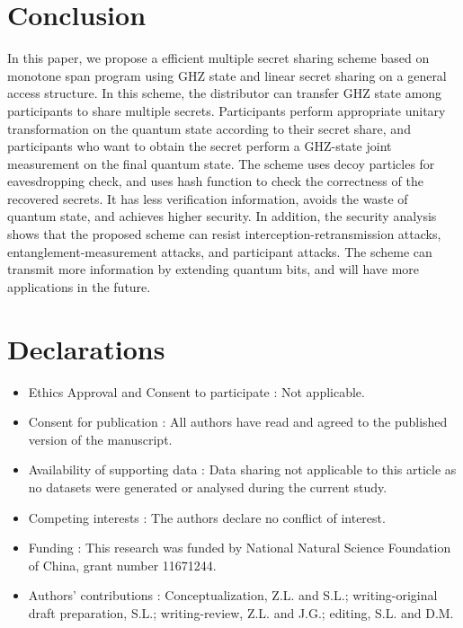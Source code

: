 \documentclass[pdflatex,sn-mathphys]{sn-jnl}%
\theoremstyle{thmstyleone}%
\theoremstyle{thmstyletwo}%
\theoremstyle{thmstylethree}%
\begin{document}


\section{Conclusion}\label{sec7}

In this paper, we propose a efficient multiple secret sharing scheme based on monotone span program using GHZ state and linear secret sharing on a general access structure. In this scheme, the distributor can transfer GHZ state among participants to share multiple secrets. Participants perform appropriate unitary transformation on the quantum state according to their secret share, and participants who want to obtain the secret perform a GHZ-state joint measurement on the final quantum state. The scheme uses decoy particles for eavesdropping check, and uses hash function to check the correctness of the recovered secrets. It has less verification information, avoids the waste of quantum state, and achieves higher security. In addition, the security analysis shows that the proposed scheme can resist interception-retransmission attacks, entanglement-measurement attacks, and participant attacks. The scheme can transmit more information by extending quantum bits, and will have more applications in the future.

\backmatter


\section*{Declarations}


\begin{itemize}
\item Ethics Approval and Consent to participate : Not applicable.
\item Consent for publication : All authors have read and agreed to the published version of the manuscript.
\item Availability of supporting data : Data sharing not applicable to this article as no datasets were generated or analysed during the current study.
\item Competing interests : The authors declare no conflict of interest. 
\item Funding : This research was funded by National Natural Science Foundation of China, grant number 11671244.
\item Authors' contributions : Conceptualization, Z.L. and S.L.; writing-original draft preparation, S.L.; writing-review, Z.L. and J.G.; editing, S.L. and D.M.
\end{itemize}
\end{document}
